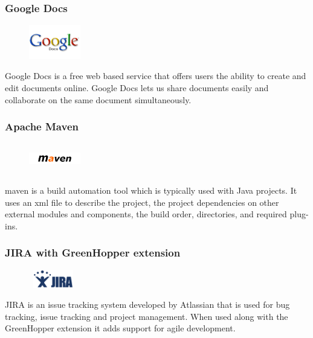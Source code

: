 \subsubsection{Google Docs}
\begin{figure}
  \vspace{-115pt}
  \begin{center}
    \includegraphics[width=0.2\textwidth]{GoogleDocs}
  \end{center}

\end{figure}
Google Docs is a free web based service that offers users the ability to create and edit documents online. Google Docs lets us share documents easily and collaborate on the same document simultaneously.	

\subsubsection{Apache Maven}
\begin{figure}
  \vspace{-35pt}
  \begin{center}
    \includegraphics[width=0.2\textwidth, height=50px]{Maven}
  \end{center}

\end{figure}
\gls{maven} is a build automation tool which is typically used with Java projects. It uses an \gls{xml} file to describe the project, the project dependencies on other external modules and components, the build order, directories, and required plug-ins.   

\subsubsection{JIRA with GreenHopper extension}
\begin{figure}
  \vspace{-40pt}
  \begin{center}
    \includegraphics[width=80px,height=30px]{Jira}
  \end{center}

\end{figure}
JIRA is an issue tracking system developed by Atlassian that is used for bug tracking, issue tracking and project management. When used along with the GreenHopper extension it adds support for agile development.

